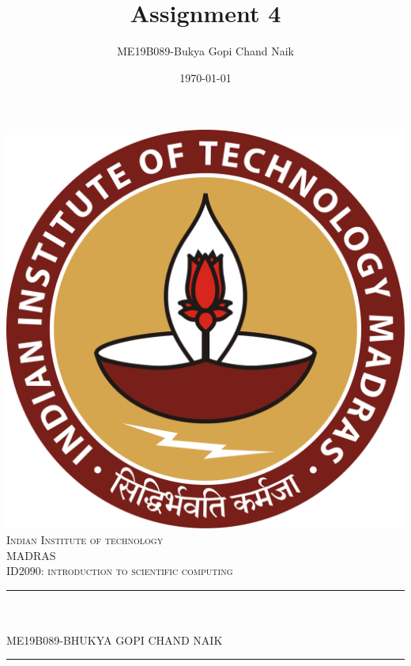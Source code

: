 \documentclass[12pt]{article}
\title{Assignment 4}								%
\author{ME19B089-Bukya Gopi Chand Naik}								%
\date{\today}											%
\makeatletter
\let\thetitle\@title
\makeatother
\begin{document}

\begin{titlepage}
	\centering
    \vspace*{0.1 cm}
    \includegraphics[scale = 0.25]{iitm.jpg}\\[1.0 cm]	%
    \textsc{\LARGE Indian Institute of technology}\\ [0.5 cm]%
    \textsc{\LARGE MADRAS} \\ [2.0 cm]
	\textsc{\Large ID2090: introduction to scientific computing}\\[0.5 cm]				%
	\rule{\linewidth}{0.3 mm} \\[0.4 cm]
	{ \huge \bfseries \thetitle}\\
	\text\newline\newline\large  {ME19B089-BHUKYA GOPI CHAND NAIK}
	\rule{\linewidth}{0.2 mm} \\[0.5 cm]
	
    \end{titlepage}


\newpage
\end{document}
